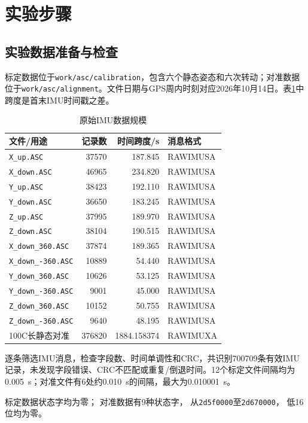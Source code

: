 \section{实验步骤}

\subsection{实验数据准备与检查}
标定数据位于\nolinkurl{work/asc/calibration}，包含六个静态姿态和六次转动；对准数据位于\nolinkurl{work/asc/alignment}。文件日期与GPS周内时刻对应2026年10月14日。表\ref{tab:data}中跨度是首末IMU时间戳之差。

\begin{table}[htbp]\centering\small
\caption{原始IMU数据规模}\label{tab:data}
\begin{tabular}{lrrl}\toprule
文件/用途&记录数&时间跨度/s&消息格式\\\midrule
\texttt{X\_up.ASC}&37570&187.845&RAWIMUSA\\
\texttt{X\_down.ASC}&46965&234.820&RAWIMUSA\\
\texttt{Y\_up.ASC}&38423&192.110&RAWIMUSA\\
\texttt{Y\_down.ASC}&36650&183.245&RAWIMUSA\\
\texttt{Z\_up.ASC}&37995&189.970&RAWIMUSA\\
\texttt{Z\_down.ASC}&38104&190.515&RAWIMUSA\\
\texttt{X\_down\_360.ASC}&37874&189.365&RAWIMUSA\\
\texttt{X\_down\_-360.ASC}&10889&54.440&RAWIMUSA\\
\texttt{Y\_down\_360.ASC}&10626&53.125&RAWIMUSA\\
\texttt{Y\_down\_-360.ASC}&9001&45.000&RAWIMUSA\\
\texttt{Z\_down\_360.ASC}&10152&50.755&RAWIMUSA\\
\texttt{Z\_down\_-360.ASC}&9640&48.195&RAWIMUSA\\
100C长静态对准&376820&1884.158374&RAWIMUXA\\\bottomrule
\end{tabular}\end{table}

逐条筛选IMU消息，检查字段数、时间单调性和CRC，共识别700709条有效IMU记录，未发现字段错误、CRC不匹配或重复/倒退时间。12个标定文件间隔均为0.005~s；对准文件有6处约0.010~s的间隔，最大为0.010001~s。

标定数据状态字均为零；
对准数据有9种状态字，
从\texttt{2d5f0000}至\texttt{2d670000}，
低16位均为零。

